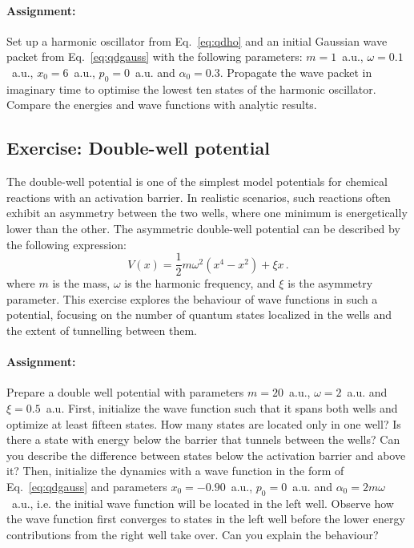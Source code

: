 \paragraph{Assignment:} Set up a harmonic oscillator from Eq.~\eqref{eq:qdho} and an initial Gaussian wave packet from Eq.~\eqref{eq:qdgauss} with the following parameters: $m=1$~a.u., $\omega=0.1$~a.u., $x_0=6$~a.u., $p_0=0$~a.u. and $\alpha_0 = 0.3$. Propagate the wave packet in imaginary time to optimise the lowest ten states of the harmonic oscillator. Compare the energies and wave functions with analytic results.

\subsection*{Exercise: Double-well potential}

The double-well potential is one of the simplest model potentials for chemical reactions with an activation barrier. In realistic scenarios, such reactions often exhibit an asymmetry between the two wells, where one minimum is energetically lower than the other. The asymmetric double-well potential can be described by the following expression:
\begin{equation*}
    V(x) = \frac{1}{2}m\omega^2(x^4 - x^2) + \xi x \, .
\end{equation*}
where $m$ is the mass, $\omega$ is the harmonic frequency, and $\xi$ is the asymmetry parameter. This exercise explores the behaviour of wave functions in such a potential, focusing on the number of quantum states localized in the wells and the extent of tunnelling between them.

\paragraph{Assignment:} Prepare a double well potential with parameters $m=20$~a.u., $\omega=2$~a.u. and $\xi=0.5$~a.u. First, initialize the wave function such that it spans both wells and optimize at least fifteen states. 
How many states are located only in one well? Is there a state with energy below the barrier that tunnels between the wells? Can you describe the difference between states below the activation barrier and above it?
Then, initialize the dynamics with a wave function in the form of Eq.~\eqref{eq:qdgauss} and parameters $x_0=-0.90$~a.u., $p_0=0$~a.u. and $\alpha_0 = 2m\omega$~a.u., i.e. the initial wave function will be located in the left well. Observe how the wave function first converges to states in the left well before the lower energy contributions from the right well take over. Can you explain the behaviour?

